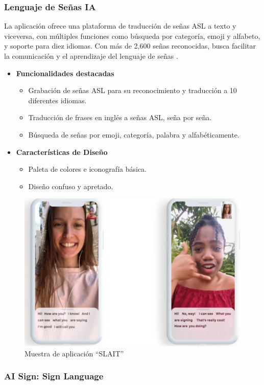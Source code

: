 \subsubsection{Lenguaje de Señas IA}

La aplicación ofrece una plataforma de traducción de señas ASL a texto y viceversa, con múltiples funciones como búsqueda por categoría, emoji y alfabeto, y soporte para diez idiomas. Con más de 2,600 señas reconocidas, busca facilitar la comunicación y el aprendizaje del lenguaje de señas \cite{LenguajeDeSeñasIA}.

\begin{itemize}
    \item \textbf{Funcionalidades destacadas}
    \begin{itemize}
        \item Grabación de señas ASL para su reconocimiento y traducción a 10 diferentes idiomas.
        \item Traducción de frases en inglés a señas ASL, seña por seña.
        \item Búsqueda de señas por emoji, categoría, palabra y alfabéticamente.
    \end{itemize}

    \item \textbf{Características de Diseño}
    \begin{itemize}
        \item Paleta de colores e iconografía básica.
        \item Diseño confuso y apretado.
    \end{itemize}
\end{itemize}

\begin{figure} [h]
    \centering
    \includegraphics[width=0.5\linewidth]{figuras/slait.png}
    \caption{Muestra de aplicación “SLAIT”}
    \label{fig:enter-label}
\end{figure}

\subsubsection{AI Sign: Sign Language}

